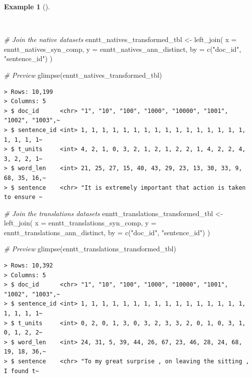 \documentclass[
  letterpaper,
  DIV=11,
  numbers=noendperiod]{scrreport}
\newenvironment{Shaded}{\begin{snugshade}}{\end{snugshade}}
\newcommand{\AttributeTok}[1]{\textcolor[rgb]{0.00,0.00,0.00}{#1}}
\newcommand{\CommentTok}[1]{\textcolor[rgb]{0.00,0.00,0.00}{\textit{#1}}}
\newcommand{\FunctionTok}[1]{\textcolor[rgb]{0.00,0.00,0.00}{#1}}
\newcommand{\NormalTok}[1]{\textcolor[rgb]{0.00,0.00,0.00}{#1}}
\newcommand{\OtherTok}[1]{\textcolor[rgb]{0.00,0.00,0.00}{#1}}
\newcommand{\StringTok}[1]{\textcolor[rgb]{0.00,0.00,0.00}{#1}}
\theoremstyle{definition}
\newtheorem{example}{Example}[chapter]
\theoremstyle{remark}
\begin{document}
\begin{example}[]\protect\hypertarget{exm-td-merging-join-left-syn-comp}{}\label{exm-td-merging-join-left-syn-comp}

~

\begin{Shaded}
\begin{Highlighting}[]
\CommentTok{\# Join the native datasets}
\NormalTok{enntt\_natives\_transformed\_tbl }\OtherTok{\textless{}{-}} 
  \FunctionTok{left\_join}\NormalTok{(}
    \AttributeTok{x =}\NormalTok{ enntt\_natives\_syn\_comp, }
    \AttributeTok{y =}\NormalTok{ enntt\_natives\_ann\_distinct, }
    \AttributeTok{by =} \FunctionTok{c}\NormalTok{(}\StringTok{"doc\_id"}\NormalTok{, }\StringTok{"sentence\_id"}\NormalTok{)}
\NormalTok{  )}

\CommentTok{\# Preview }
\FunctionTok{glimpse}\NormalTok{(enntt\_natives\_transformed\_tbl)}
\end{Highlighting}
\end{Shaded}

\begin{verbatim}
> Rows: 10,199
> Columns: 5
> $ doc_id      <chr> "1", "10", "100", "1000", "10000", "1001", "1002", "1003",~
> $ sentence_id <int> 1, 1, 1, 1, 1, 1, 1, 1, 1, 1, 1, 1, 1, 1, 1, 1, 1, 1, 1, 1~
> $ t_units     <int> 4, 2, 1, 0, 3, 2, 1, 2, 1, 2, 2, 1, 4, 2, 2, 4, 3, 2, 2, 1~
> $ word_len    <int> 21, 25, 27, 15, 40, 43, 29, 23, 13, 30, 33, 9, 68, 35, 16,~
> $ sentence    <chr> "It is extremely important that action is taken to ensure ~
\end{verbatim}

\begin{Shaded}
\begin{Highlighting}[]
\CommentTok{\# Join the translations datasets }
\NormalTok{enntt\_translations\_transformed\_tbl }\OtherTok{\textless{}{-}} 
  \FunctionTok{left\_join}\NormalTok{(}
    \AttributeTok{x =}\NormalTok{ enntt\_translations\_syn\_comp,}
    \AttributeTok{y =}\NormalTok{ enntt\_translations\_ann\_distinct,}
    \AttributeTok{by =} \FunctionTok{c}\NormalTok{(}\StringTok{"doc\_id"}\NormalTok{, }\StringTok{"sentence\_id"}\NormalTok{)}
\NormalTok{  )}

\CommentTok{\# Preview}
\FunctionTok{glimpse}\NormalTok{(enntt\_translations\_transformed\_tbl)}
\end{Highlighting}
\end{Shaded}

\begin{verbatim}
> Rows: 10,392
> Columns: 5
> $ doc_id      <chr> "1", "10", "100", "1000", "10000", "1001", "1002", "1003",~
> $ sentence_id <int> 1, 1, 1, 1, 1, 1, 1, 1, 1, 1, 1, 1, 1, 1, 1, 1, 1, 1, 1, 1~
> $ t_units     <int> 0, 2, 0, 1, 3, 0, 3, 2, 3, 3, 2, 0, 1, 0, 3, 1, 0, 1, 2, 2~
> $ word_len    <int> 24, 31, 5, 39, 44, 26, 67, 23, 46, 28, 24, 68, 19, 18, 36,~
> $ sentence    <chr> "To my great surprise , on leaving the sitting , I found t~
\end{verbatim}

\end{example}
\end{document}
